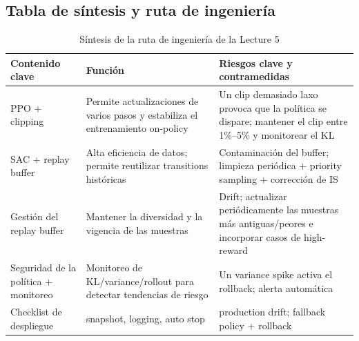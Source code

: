 \subsection{Tabla de síntesis y ruta de ingeniería}

\begin{table}[H]
\centering
\begin{tabular}{p{} p{} p{}}
\toprule
Contenido clave & Función & Riesgos clave y contramedidas \\
\midrule
PPO + clipping & Permite actualizaciones de varios pasos y estabiliza el entrenamiento on-policy & Un clip demasiado laxo provoca que la política se dispare; mantener el clip entre 1\%--5\% y monitorear el KL \\
SAC + replay buffer & Alta eficiencia de datos; permite reutilizar transitions históricas & Contaminación del buffer; limpieza periódica + priority sampling + corrección de IS \\
Gestión del replay buffer & Mantener la diversidad y la vigencia de las muestras & Drift; actualizar periódicamente las muestras más antiguas/peores e incorporar casos de high-reward \\
Seguridad de la política + monitoreo & Monitoreo de KL/variance/rollout para detectar tendencias de riesgo & Un variance spike activa el rollback; alerta automática \\
Checklist de despliegue & snapshot, logging, auto stop & production drift; fallback policy + rollback \\
\bottomrule
\end{tabular}
\caption{Síntesis de la ruta de ingeniería de la Lecture 5}
\end{table}

